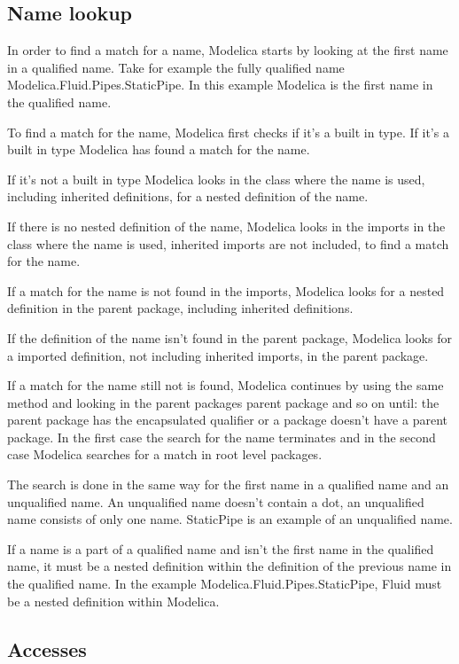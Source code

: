 \documentclass{cslthse-msc}
\begin{document}
\subsection{Name lookup}
In order to find a match for a name, Modelica starts by looking at the first name in a qualified name. Take for example the fully qualified name Modelica.Fluid.Pipes.StaticPipe. In this example Modelica is the first name in the qualified name.

To find a match for the name, Modelica first checks if it's a built in type. If it's a built in type Modelica has found a match for the name.

If it's not a built in type Modelica looks in the class where the name is used, including inherited definitions, for a nested definition of the name. 

If there is no nested definition of the name, Modelica looks in the imports in the class where the name is used, inherited imports are not included, to find a match for the name.

If a match for the name is not found in the imports, Modelica looks for a nested definition in the parent package, including inherited definitions.

If the definition of the name isn't found in the parent package, Modelica looks for a imported definition, not including inherited imports, in the parent package.

If a match for the name still not is found, Modelica continues by using the same method and looking in the parent packages parent package and so on until: the parent package has the encapsulated qualifier or a package doesn't have a parent package. In the first case the search for the name terminates and in the second case Modelica searches for a match in root level packages.

The search is done in the same way for the first name in a qualified name and an unqualified name. An unqualified name doesn't contain a dot, an unqualified name consists of only one name. StaticPipe is an example of an unqualified name.

If a name is a part of a qualified name and isn't the first name in the qualified name, it must be a nested definition within the definition of the previous name in the qualified name. In the example Modelica.Fluid.Pipes.StaticPipe, Fluid must be a nested definition within Modelica.\cite{modelicamodelica, tillermodelica}

\subsection{Accesses}
\end{document}
